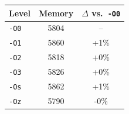 \begin{tabular*}{\columnwidth}{@{\extracolsep\fill}lcc@{\extracolsep\fill}}
\toprule
\textbf{Level} & \textbf{Memory} & \textbf{$\Delta$ vs.\ \texttt{-O0}} \\
\midrule
\texttt{-O0} & 5804 & -- \\
\texttt{-O1} & 5860 & +1\% \\
\texttt{-O2} & 5818 & +0\% \\
\texttt{-O3} & 5826 & +0\% \\
\texttt{-Os} & 5862 & +1\% \\
\texttt{-Oz} & 5790 & -0\% \\
\bottomrule
\end{tabular*}
